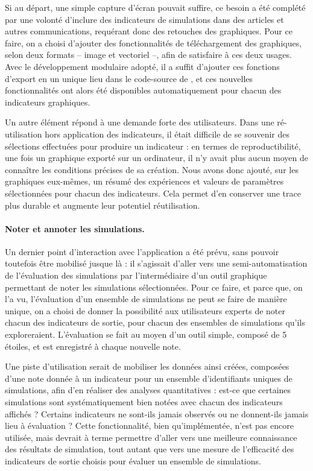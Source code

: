 Si au départ, une simple capture d'écran pouvait suffire, ce besoin a été complété par une volonté d'inclure des indicateurs de simulations dans des articles et autres communications, requérant donc des retouches des graphiques.
Pour ce faire, on a choisi d'ajouter des fonctionnalités de téléchargement des graphiques, selon deux formats -- image et vectoriel --, afin de satisfaire à ces deux usages.
Avec le développement modulaire adopté, il a suffit d'ajouter ces fonctions d'export en un unique lieu dans le code-source de \simedb{}, et ces nouvelles fonctionnalités ont alors été disponibles automatiquement pour chacun des indicateurs graphiques.

Un autre élément répond à une demande forte des utilisateurs.
Dans une ré-utilisation hors application des indicateurs, il était difficile de se souvenir des sélections effectuées pour produire un indicateur : en termes de reproductibilité, une fois un graphique exporté sur un ordinateur, il n'y avait plus aucun moyen de connaître les conditions précises de sa création.
Nous avons donc ajouté, sur les graphiques eux-mêmes, un résumé des expériences et valeurs de paramètres sélectionnées pour chacun des indicateurs.
Cela permet d'en conserver une trace plus durable et augmente leur potentiel réutilisation.

\paragraph{Noter et annoter les simulations.}\label{par:noter-simul}

Un dernier point d'interaction avec l'application a été prévu, sans pouvoir toutefois être mobilisé jusque là : il s'agissait d'aller vers une semi-automatisation de l'évaluation des simulations par l'intermédiaire d'un outil graphique permettant de \og noter\fg{} les simulations sélectionnées.
Pour ce faire, et parce que, on l'a vu, l'évaluation d'un ensemble de simulations ne peut se faire de manière unique, on a choisi de donner la possibilité aux utilisateurs experts de noter chacun des indicateurs de sortie, pour chacun des ensembles de simulations qu'ils exploreraient.
L'évaluation se fait au moyen d'un outil simple, composé de 5 \og étoiles\fg{}, et est enregistré à chaque nouvelle note.

Une piste d'utilisation serait de mobiliser les données ainsi créées, composées d'une note donnée à un indicateur pour un ensemble d'identifiants uniques de simulations, afin d'en réaliser des analyses quantitatives : est-ce que certaines simulations sont systématiquement bien notées avec chacun des indicateurs affichés ? Certains indicateurs ne sont-ils jamais observés ou ne donnent-ils jamais lieu à évaluation ?
Cette fonctionnalité, bien qu'implémentée, n'est pas encore utilisée, mais devrait à terme permettre d'aller vers une meilleure connaissance des résultats de simulation, tout autant que vers une mesure de l'efficacité des indicateurs de sortie choisis pour évaluer un ensemble de simulations.

